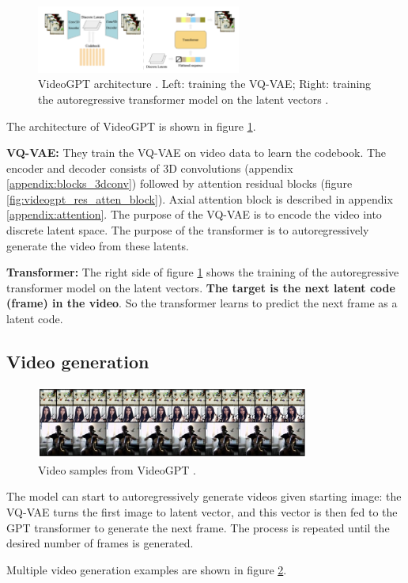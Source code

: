 \begin{figure}
    \centering
    \includegraphics[width=0.6\textwidth]{images/video_gpt/architecture.png}
    \caption{VideoGPT architecture \cite{videogpt}. Left: training the VQ-VAE; Right: training the autoregressive transformer model on the latent vectors \cite{videogpt}.}
    \label{fig:videogpt_architecture}
\end{figure}

The architecture of VideoGPT is shown in figure \ref{fig:videogpt_architecture}.

\textbf{VQ-VAE:} They train the VQ-VAE on video data to learn the codebook. The encoder and decoder consists of 3D convolutions (appendix \ref{appendix:blocks_3dconv}) followed by attention residual blocks (figure \ref{fig:videogpt_res_atten_block}). Axial attention \cite{axial_attention} block is described in appendix \ref{appendix:attention}. The purpose of the VQ-VAE is to encode the video into discrete latent space. The purpose of the transformer is to autoregressively generate the video from these latents.

\textbf{Transformer:} The right side of figure \ref{fig:videogpt_architecture} shows the training of the autoregressive transformer model on the latent vectors. \textbf{The target is the next latent code (frame) in the video}. So the transformer learns to predict the next frame as a latent code.






\subsection{Video generation}

\begin{figure}
    \centering
    \includegraphics[width=0.8\textwidth]{images/video_gpt/video_generation.png}
    \caption{Video samples from VideoGPT \cite{videogpt}.}
    \label{fig:videogpt_video_generation}
\end{figure}

The model can start to autoregressively generate videos given starting image: the VQ-VAE turns the first image to latent vector, and this vector is then fed to the GPT transformer to generate the next frame. The process is repeated until the desired number of frames is generated.

Multiple video generation examples are shown in figure \ref{fig:videogpt_video_generation}.


